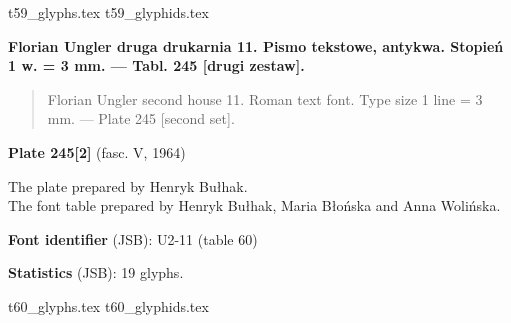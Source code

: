 \documentclass[12pt]{article}
\newcommand{\bg}{\begingl}
\newcommand{\pismoPL}[1]{{\relsize{2}\Junicode\textbf{#1}}}
\newcommand{\pismoEN}[1]{{\relsize{1}\Junicode\begin{quote}#1\end{quote}}}
\newcommand{\plate}[3]{\textbf{Plate #1} (fasc. #2, #3)}
\newcommand{\exampleBib}[1]{{\relsize{2}\Junicode\textbf{The
      example:}\\[2ex] CATALOGUS LIBRORUM \textbf{#1}}}
\newcommand{\exampleDesc}[1]{{\relsize{0}\Junicode#1}}
\newcommand{\exampleDig}[1]{{\relsize{0}\Junicode \textbf{Digitization(s) [JSB]:} #1}}
\newcommand{\exampleLib}[1]{{\relsize{0}\Junicode \textbf{Library:} #1}}
\newcommand{\examplePL}[1]{}
\newcommand{\exampleEN}[1]{}
\newcommand{\fontID}[2]{{\relsize{1}\Junicode\textbf{Font identifier} (JSB): #1 (table #2)}}
\newcommand{\fontstat}[1]{{\relsize{1}\Junicode\textbf{Statistics} (JSB): #1 glyphs.}}
\newcommand{\exampleRef}[1]{{\relsize{0}\Junicode \textbf{References:} #1}}
\newcommand{\examplePage}[1]{{Page reference: \relsize{0}\Junicode#1}}
\begin{document}
  {t59_glyphs.tex}
  {t59_glyphids.tex}




 \newpage
 
% 

 

 \pismoPL{Florian Ungler druga drukarnia 11. Pismo tekstowe, antykwa. Stopień 1 w. = 3 mm. — Tabl. 245 [drugi zestaw].}
  
 \pismoEN{Florian Ungler second house 11. Roman text font. Type size 1 line = 3 mm. — Plate 245 [second set].}

\plate{245[2]}{V}{1964}

The plate prepared by Henryk Bułhak.\\
The font table prepared by Henryk Bułhak,  Maria Błońska and Anna Wolińska.

\bigskip














\bigskip

\fontID{U2-11}{60}

\fontstat{19}

  {t60_glyphs.tex}
  {t60_glyphids.tex}
\end{document}
